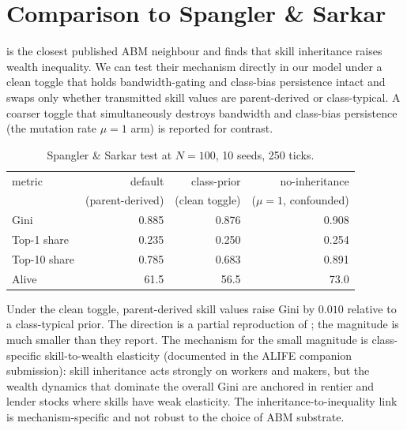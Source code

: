 \documentclass[11pt]{article}
\begin{document}
\section{Comparison to Spangler \& Sarkar}
\label{sec:spangler}

\citet{spangler2022distribution} is the closest published ABM
neighbour and finds that skill inheritance raises wealth inequality.
We can test their mechanism directly in our model under a clean
toggle that holds bandwidth-gating and class-bias persistence intact
and swaps only whether transmitted skill values are parent-derived
or class-typical.  A coarser toggle that simultaneously destroys
bandwidth and class-bias persistence (the mutation rate $\mu = 1$
arm) is reported for contrast.

\begin{table}[h]
\centering
\small
\caption{Spangler \& Sarkar test at $N = 100$, 10 seeds, 250 ticks.}
\label{tab:spangler}
\begin{tabular}{lrrr}
\toprule
metric & default & class-prior & no-inheritance \\
       & (parent-derived) & (clean toggle) & ($\mu = 1$, confounded) \\
\midrule
Gini             & 0.885 & 0.876 & 0.908 \\
Top-1 share      & 0.235 & 0.250 & 0.254 \\
Top-10 share     & 0.785 & 0.683 & 0.891 \\
Alive            & 61.5  & 56.5  & 73.0 \\
\bottomrule
\end{tabular}
\end{table}

Under the clean toggle, parent-derived skill values raise Gini by
$0.010$ relative to a class-typical prior.  The direction is a
partial reproduction of \citet{spangler2022distribution}; the
magnitude is much smaller than they report.  The mechanism for the
small magnitude is class-specific skill-to-wealth elasticity
(documented in the ALIFE companion submission): skill inheritance
acts strongly on workers and makers, but the wealth dynamics that
dominate the overall Gini are anchored in rentier and lender stocks
where skills have weak elasticity.  The inheritance-to-inequality
link is mechanism-specific and not robust to the choice of ABM
substrate.

\end{document}
